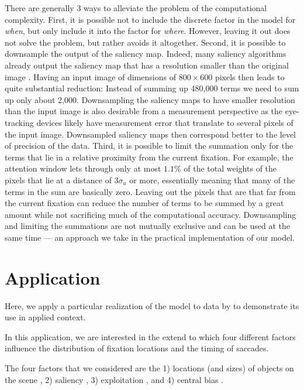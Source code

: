 \documentclass{article}
\begin{document}
There are generally 3 ways to alleviate the problem of the computational complexity. First, it is possible not to include the discrete factor in the model for \textit{when}, but only include it into the factor for \textit{where}. However, leaving it out does not solve the problem, but rather avoids it altogether. Second, it is possible to downsample the output of the saliency map. Indeed, many saliency algorithms already output the saliency map that has a resolution smaller than the original image \citep[e.g., by a factor of $16$ in each of the dimensions,][] {itti1998model}. Having an input image of dimensions of $800\times600$ pixels then leads to quite substantial reduction: Instead of summing up 480,000 terms we need to sum up only about 2,000. Downsampling the saliency maps to have smaller resolution than the input image is also desirable from a measurement perspective as the eye-tracking devices likely have measurement error that translate to several pixels of the input image.  Downsampled saliency maps then correspond better to the level of precision of the data. Third, it is possible to limit the summation only for the terms that lie in a relative proximity from the current fixation. For example, the attention window lets through only at most $1.1\%$ of the total weights of the pixels that lie at a distance of $3\sigma_a$ or more, essentially meaning that many of the terms in the sum are basically zero. Leaving out the pixels that are that far from the current fixation can reduce the number of terms to be summed by a great amount while not sacrificing much of the computational accuracy. Downsampling and limiting the summations are not mutually exclusive and can be used at the same time --- an approach we take in the practical implementation of our model.



\section{Application}

Here, we apply a particular realization of the model to data by \citet{renswoude2019object_familiarity} to demonstrate its use in applied context.

In this application, we are interested in the extend to which four different factors influence the distribution of fixation locations and the timing of saccades. 

The four factors that we considered are the 1) locations (and sizes) of objects on the scene \citep{xu2014beyond,renswoude2019object_familiarity}, 2) saliency \citep{itti1998model,itti2000saliency,itti2001computational}, 3) exploitation \citep[i.e., tendency to make repeated fixations in a relative proximity to previous fixation;][]{malem2020exploration}, and 4) central bias \citep{renswoude2019central}. 
\end{document}
